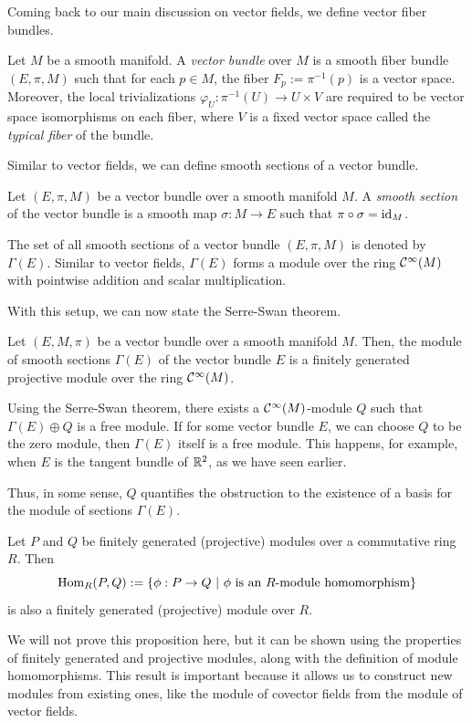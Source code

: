 Coming back to our main discussion on vector fields, we define vector fiber bundles.
\begin{definition}
	Let \(M\) be a smooth manifold. A \emph{vector bundle} over \(M\) is a smooth fiber bundle \((E, \pi, M)\) such that for each \(p \in M\), the fiber \(F_p := \pi^{-1}(p)\) is a vector space. Moreover, the local trivializations \(\varphi_U: \pi^{-1}(U) \to U \times V\) are required to be vector space isomorphisms on each fiber, where \(V\) is a fixed vector space called the \emph{typical fiber} of the bundle.
\end{definition}
Similar to vector fields, we can define smooth sections of a vector bundle.
\begin{definition}
	Let \((E, \pi, M)\) be a vector bundle over a smooth manifold \(M\). A \emph{smooth section} of the vector bundle is a smooth map \(\sigma: M \to E\) such that \(\pi \circ \sigma = \operatorname{id}_M\).
\end{definition}
The set of all smooth sections of a vector bundle \((E, \pi, M)\) is denoted by \(\Gamma(E)\). Similar to vector fields, \(\Gamma(E)\) forms a module over the ring \(\mathcal C^\infty(M)\) with pointwise addition and scalar multiplication.

With this setup, we can now state the Serre-Swan theorem.
\begin{theorem}
	Let \((E, M, \pi)\) be a vector bundle over a smooth manifold \(M\). Then, the module of smooth sections \(\Gamma(E)\) of the vector bundle \(E\) is a finitely generated projective module over the ring \(\mathcal C^\infty(M)\).
\end{theorem}
\begin{remark}
	Using the Serre-Swan theorem, there exists a \(\mathcal C^\infty(M)\)-module \(Q\) such that \(\Gamma(E) \oplus Q\) is a free module. If for some vector bundle \(E\), we can choose \(Q\) to be the zero module, then \(\Gamma(E)\) itself is a free module. This happens, for example, when \(E\) is the tangent bundle of \(\mathbb R^2\), as we have seen earlier.

	Thus, in some sense, \(Q\) quantifies the obstruction to the existence of a basis for the module of sections \(\Gamma(E)\).
\end{remark}
\begin{proposition}
	Let \(P\) and \(Q\) be finitely generated (projective) modules over a commutative ring \(R\). Then
	\begin{equation}
		\operatorname{Hom}_R(P, Q) := \qty{\phi: P \to Q \ \middle|\ \phi \text{ is an } R\text{-module homomorphism}}
	\end{equation}
	is also a finitely generated (projective) module over \(R\).
\end{proposition}
We will not prove this proposition here, but it can be shown using the properties of finitely generated and projective modules, along with the definition of module homomorphisms. This result is important because it allows us to construct new modules from existing ones, like the module of covector fields from the module of vector fields.

